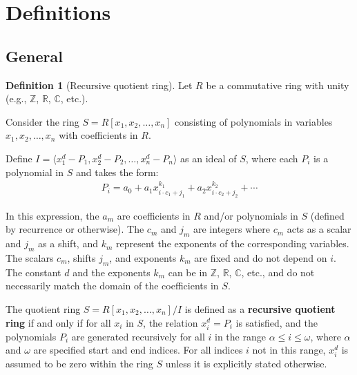 \documentclass{article}
\theoremstyle{plain}
\theoremstyle{definition}
\newtheorem{definition}{Definition}
\newcommand{\Z}{\mathbb{Z}}
\begin{document}
\section{Definitions}
\subsection{General}

\begin{definition}[Recursive quotient ring] \label{definition:recursivering}
Let \( R \) be a commutative ring with unity (e.g., \(\Z\), \(\mathbb{R}\), \(\mathbb{C}\), etc.).

Consider the ring \( S = R[x_1, x_2, \ldots, x_{n} ] \) consisting of polynomials in variables \( x_1, x_2, \ldots, x_n \) with coefficients in \( R \).

Define \( I = \langle x_1^d - P_1, x_2^d - P_2, \ldots, x_n^d - P_n \rangle \) as an ideal of \( S \), where each \( P_i \) is a polynomial in \( S \) and takes the form:
\begin{align}
    P_i = a_0 + a_1 x_{i \cdot c_1 + j_1}^{k_1} + a_2 x_{i \cdot c_2 + j_2}^{k_2} + \cdots
\end{align}

In this expression, the \( a_m \) are coefficients in \( R \) and/or polynomials in \( S \) (defined by recurrence or otherwise). The \( c_m \) and \( j_m \) are integers where \( c_m \) acts as a scalar and \( j_m \) as a shift, and \( k_m \) represent the exponents of the corresponding variables. The scalars \( c_m \), shifts \( j_m \), and exponents \( k_m \) are fixed and do not depend on \( i \). The constant \( d \) and the exponents \( k_m \) can be in \(\Z\), \(\mathbb{R}\), \(\mathbb{C}\), etc., and do not necessarily match the domain of the coefficients in \( S \).

The quotient ring \( S = R[x_1, x_2, \ldots, x_{n}]/I \) is defined as a \textbf{recursive quotient ring} if and only if for all \( x_i \) in \( S \), the relation \( x_i^d = P_i \) is satisfied, and the polynomials \( P_i \) are generated recursively for all \( i \) in the range \( \alpha \leq i \leq \omega \), where \( \alpha \) and \( \omega \) are specified start and end indices. For all indices \( i \) not in this range, \( x_i^d \) is assumed to be zero within the ring \( S \) unless it is explicitly stated otherwise.
\end{definition}
\end{document}
